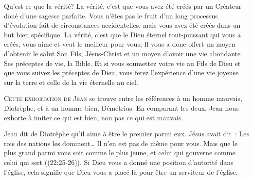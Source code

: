 Qu'est-ce que la vérité? La vérité, c'est que vous avez été créés
 par un Créateur doué d'une sagesse parfaite.
 Vous n'êtes pas le fruit d'un long processus d'évolution
 fait de circonstances accidentelles, mais vous avez été créés
 dans un but bien spécifique. La vérité, c'est que le Dieu éternel
 tout-puissant qui vous a créés, vous aime et veut le meilleur pour vous;
 Il vous a donc offert un moyen d'obtenir le salut
 \ocadr Son Fils, Jésus-Christ \fcadr{} et un moyen d'avoir une vie abondante
 \ocadr Ses préceptes de vie, la Bible.
 Et si vous soumettez votre vie au Fils de Dieu et que vous suivez
 les préceptes de Dieu, vous ferez l'expérience d'une vie joyeuse
 sur la terre et celle de la vie éternelle au ciel. 

\dvrule







\lettrine{C}{ette exhortation de Jean} se trouve entre les références
 à un homme mauvais, Diotrèphe, et à un homme bien, 
 Démétrius.
 En comparant les deux, Jean nous exhorte à imiter ce qui est bien, 
 non pas ce qui est mauvais. 

Jean dit de Diotrèphe qu'il \og aime à être le premier parmi eux. \fg{}
 Jésus avait dit~: 
 \fg{} Les rois des nations les dominent\dots{}
 Il n'en est pas de même pour vous. Mais que le plus grand parmi vous
 soit comme le plus jeune, et celui qui gouverne comme celui qui sert \fg{}
 ((22:25-26)).
 Si Dieu vous a donné une position d'autorité dans l'église,
 cela signifie que Dieu vous a placé là pour être un serviteur de l'église.


